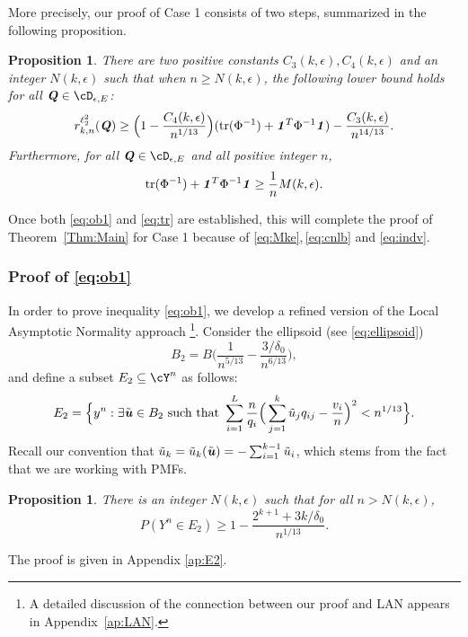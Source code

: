 \documentclass[11pt,onecolumn]{IEEEtran}
\newtheorem{proposition}[theorem]{Proposition}
\def\mathbi#1{{\textbf{\textit #1}}}
\DeclareMathOperator{\tr}{tr}
\begin{document}
More precisely, our proof of Case 1 consists of two steps, summarized in the following proposition. 
\begin{proposition}\label{prop:Case1}
There are two positive constants $C_3(k,\epsilon),C_4(k,\epsilon)$ and an integer $N(k,\epsilon)$ such that when $n \ge N(k,\epsilon)$,
the following lower bound holds for all $\mathbi{Q}\in \cD_{\epsilon,E}$:
\begin{equation}\label{eq:ob1} 
r_{k,n}^{\ell_2^2} (\mathbi{Q}) \ge
\Big(1  - \frac{C_4(k,\epsilon)}{n^{1/13}} \Big)
 ( \tr(\Phi^{-1}) + \mathbi{1}^T \Phi^{-1} \mathbi{1} ) 
 -  \frac{C_3(k,\epsilon)}{n^{14/13}} .
\end{equation}
Furthermore, for all $\mathbi{Q}\in \cD_{\epsilon,E}$ and all positive integer $n$,
   \begin{equation}\label{eq:tr}
\tr(\Phi^{-1}) + \mathbi{1}^T \Phi^{-1} \mathbi{1}
\ge \frac 1n M(k,\epsilon).
   \end{equation}
\end{proposition}

Once both \eqref{eq:ob1} and \eqref{eq:tr} are established, this will complete the proof of Theorem~\ref{Thm:Main} for Case 1 because of  \eqref{eq:Mke},\,\eqref{eq:cnlb} and \eqref{eq:indv}.

\vspace{.1in}\subsubsection{Proof of \eqref{eq:ob1}}
In order to prove inequality \eqref{eq:ob1}, we develop a refined version of the Local Asymptotic Normality approach \cite{Hajek72,Ibrag81}\footnote{A detailed discussion of the connection between our proof and LAN appears in Appendix~\ref{ap:LAN}.}. 
Consider the ellipsoid (see \eqref{eq:ellipsoid})
$$
B_2 = B \Big(  \frac{1}{n^{5/13}} - \frac{3/\delta_0}{n^{6/13}} \Big),
$$
and define a subset $E_2 \subseteq \cY^n$ as follows:
$$
E_2=\Big\{ y^n:  \exists \tilde{\mathbi{u}} \in B_2 \text{~such that~}
\sum_{i=1}^L \frac{n}{q_i} \Big(\sum_{j=1}^k \tilde{u}_j q_{ij} - \frac{v_i}{n} \Big)^2
< n^{1/13}  \Big\}.
$$
Recall our convention that $\tilde{u}_k=\tilde{u}_k(\tilde{\mathbi{u}})= -\sum_{i=1}^{k-1}\tilde{u}_i$, which stems from the fact that we are working with PMFs.
\begin{proposition}\label{Prop:E2}
 There is an integer $N(k,\epsilon)$ such that for all $n>N(k,\epsilon)$,
\begin{equation}\label{eq:pe2}
P(Y^n\in E_2) 
 \ge 1 - \frac{2^{k+1} + 3k/\delta_0}{n^{1/13}}.
\end{equation}
\end{proposition}
The proof is given in Appendix \ref{ap:E2}.
\end{document}
